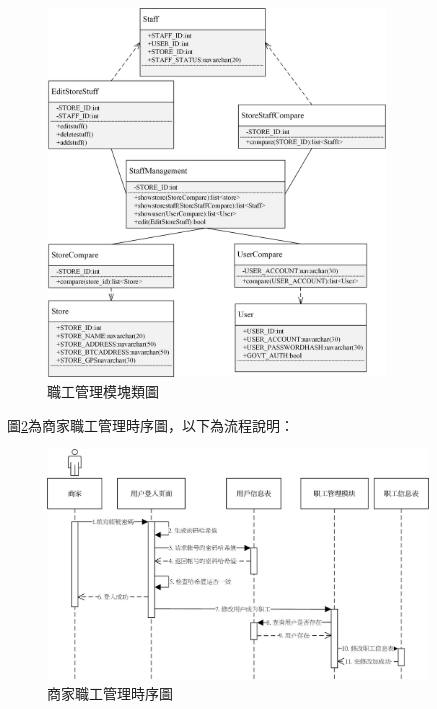	\begin{figure}[!htbp]
		\centering
		\includegraphics[width = 0.8\textwidth]{c1.jpg}
		\caption{職工管理模塊類圖}\label{c1}
	\end{figure}

	

	圖\ref{time2}為商家職工管理時序圖，以下為流程說明：

	\begin{figure}[!htbp]
		\centering
		\includegraphics[width = 0.9\textwidth]{time2.jpg}
		\caption{商家職工管理時序圖}\label{time2}
	\end{figure}

